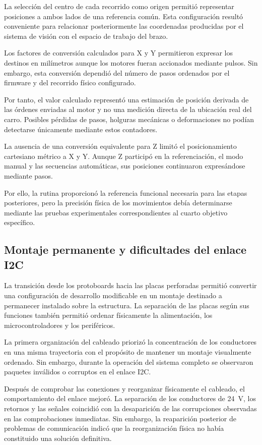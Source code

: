 La selección del centro de cada recorrido como origen permitió representar posiciones a ambos lados de una referencia común. Esta configuración resultó conveniente para relacionar posteriormente las coordenadas producidas por el sistema de visión con el espacio de trabajo del brazo.

Los factores de conversión calculados para X y Y permitieron expresar los destinos en milímetros aunque los motores fueran accionados mediante pulsos. Sin embargo, esta conversión dependió del número de pasos ordenados por el firmware y del recorrido físico configurado.

Por tanto, el valor calculado representó una estimación de posición derivada de las órdenes enviadas al motor y no una medición directa de la ubicación real del carro. Posibles pérdidas de pasos, holguras mecánicas o deformaciones no podían detectarse únicamente mediante estos contadores.

La ausencia de una conversión equivalente para Z limitó el posicionamiento cartesiano métrico a X y Y. Aunque Z participó en la referenciación, el modo manual y las secuencias automáticas, sus posiciones continuaron expresándose mediante pasos.

Por ello, la rutina proporcionó la referencia funcional necesaria para las etapas posteriores, pero la precisión física de los movimientos debía determinarse mediante las pruebas experimentales correspondientes al cuarto objetivo específico.


\subsection{Montaje permanente y dificultades del enlace I2C}

La transición desde los protoboards hacia las placas perforadas permitió convertir una configuración de desarrollo modificable en un montaje destinado a permanecer instalado sobre la estructura. La separación de las placas según sus funciones también permitió ordenar físicamente la alimentación, los microcontroladores y los periféricos.

La primera organización del cableado priorizó la concentración de los conductores en una misma trayectoria con el propósito de mantener un montaje visualmente ordenado. Sin embargo, durante la operación del sistema completo se observaron paquetes inválidos o corruptos en el enlace I2C.

Después de comprobar las conexiones y reorganizar físicamente el cableado, el comportamiento del enlace mejoró. La separación de los conductores de 24~V, los retornos y las señales coincidió con la desaparición de las corrupciones observadas en las comprobaciones inmediatas. Sin embargo, la reaparición posterior de problemas de comunicación indicó que la reorganización física no había constituido una solución definitiva.


